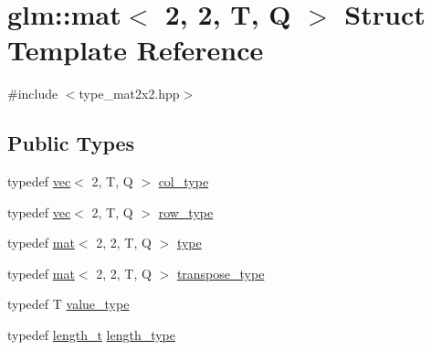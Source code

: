 \hypertarget{structglm_1_1mat_3_012_00_012_00_01_t_00_01_q_01_4}{}\section{glm\+:\+:mat$<$ 2, 2, T, Q $>$ Struct Template Reference}
\label{structglm_1_1mat_3_012_00_012_00_01_t_00_01_q_01_4}


{\ttfamily \#include $<$type\+\_\+mat2x2.\+hpp$>$}

\subsection*{Public Types}
\begin{DoxyCompactItemize}
\item 
typedef \mbox{\hyperlink{structglm_1_1vec}{vec}}$<$ 2, T, Q $>$ \mbox{\hyperlink{structglm_1_1mat_3_012_00_012_00_01_t_00_01_q_01_4_a2983591534ee443dd378cedcbe771749}{col\+\_\+type}}
\item 
typedef \mbox{\hyperlink{structglm_1_1vec}{vec}}$<$ 2, T, Q $>$ \mbox{\hyperlink{structglm_1_1mat_3_012_00_012_00_01_t_00_01_q_01_4_a362ebaadd84b755d779b8f35dbaa5ba9}{row\+\_\+type}}
\item 
typedef \mbox{\hyperlink{structglm_1_1mat}{mat}}$<$ 2, 2, T, Q $>$ \mbox{\hyperlink{structglm_1_1mat_3_012_00_012_00_01_t_00_01_q_01_4_ac6dc94bb53f4e93c806d3b38cbf9172c}{type}}
\item 
typedef \mbox{\hyperlink{structglm_1_1mat}{mat}}$<$ 2, 2, T, Q $>$ \mbox{\hyperlink{structglm_1_1mat_3_012_00_012_00_01_t_00_01_q_01_4_a9635a76e3f23ca6da671e913dfd23bfd}{transpose\+\_\+type}}
\item 
typedef T \mbox{\hyperlink{structglm_1_1mat_3_012_00_012_00_01_t_00_01_q_01_4_a6bd6b4c0d4bf7dff724cc03096b92d40}{value\+\_\+type}}
\item 
typedef \mbox{\hyperlink{namespaceglm_a090a0de2260835bee80e71a702492ed9}{length\+\_\+t}} \mbox{\hyperlink{structglm_1_1mat_3_012_00_012_00_01_t_00_01_q_01_4_a96c65b091fc8fe8e6f5637e30c9c1f81}{length\+\_\+type}}
\end{DoxyCompactItemize}
